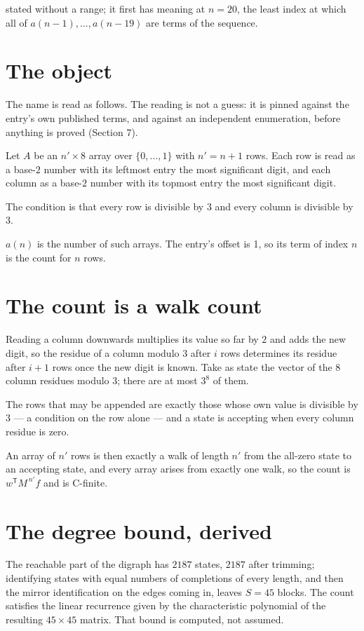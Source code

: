\documentclass[11pt]{article}
\theoremstyle{definition}
\begin{document}
stated without a range; it first has meaning at $n = 20$, the least index at which all of $a(n-1),\dots,a(n-19)$ are terms of the sequence.

\section{The object}

The name is read as follows. The reading is not a guess: it is pinned against the entry's own published terms, and against an independent enumeration, before anything is proved (Section 7).

Let $A$ be an $n' \times 8$ array over $\{0,\dots,1\}$ with $n' = n + 1$ rows. Each row is read as a base-$2$ number with its leftmost entry the most significant digit, and each column as a base-$2$ number with its topmost entry the most significant digit.

The condition is that every row is divisible by $3$ and every column is divisible by $3$.

$a(n)$ is the number of such arrays. The entry's offset is 1, so its term of index $n$ is the count for $n$ rows.

\section{The count is a walk count}

Reading a column downwards multiplies its value so far by $2$ and adds the new digit, so the residue of a column modulo $3$ after $i$ rows determines its residue after $i+1$ rows once the new digit is known. Take as state the vector of the $8$ column residues modulo $3$; there are at most $3^{8}$ of them.

The rows that may be appended are exactly those whose own value is divisible by $3$ --- a condition on the row alone --- and a state is accepting when every column residue is zero.

An array of $n'$ rows is then exactly a walk of length $n'$ from the all-zero state to an accepting state, and every array arises from exactly one walk, so the count is $w^{\mathsf T}M^{\,n'}f$ and is C-finite.

\section{The degree bound, derived}

The reachable part of the digraph has $2187$ states, $2187$ after trimming; identifying states with equal numbers of completions of every length, and then the mirror identification on the edges coming in, leaves $S = 45$ blocks. The count satisfies the linear recurrence given by the characteristic polynomial of the resulting $45\times45$ matrix. That bound is computed, not assumed.
\end{document}
